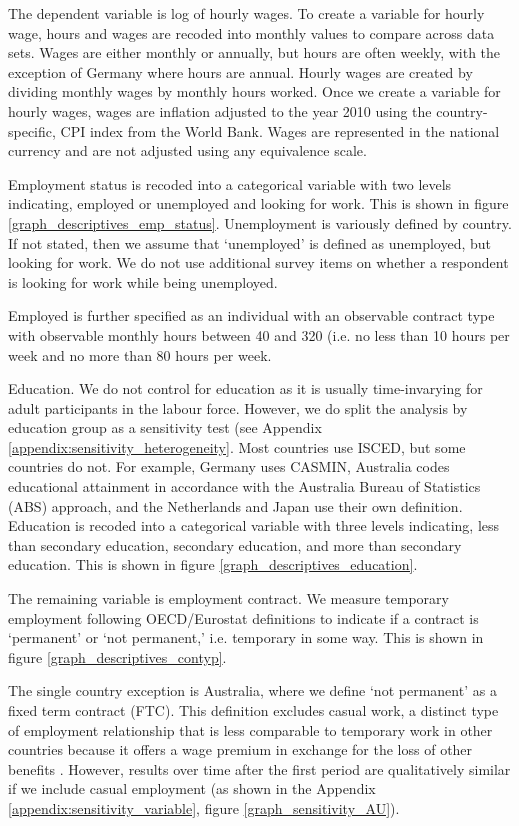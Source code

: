 The dependent variable is log of hourly wages.  To create a variable for hourly wage, hours and wages are recoded into monthly values to compare across data sets.  Wages are either monthly or annually, but hours are often weekly, with the exception of Germany where hours are annual.  Hourly wages are created by dividing monthly wages by monthly hours worked.    Once we create a variable for hourly wages, wages are inflation adjusted to the year 2010 using the country-specific, CPI index from the World Bank.  Wages are represented in the national currency and are not adjusted using any equivalence scale.  

Employment status is recoded into a categorical variable with two levels indicating, employed or unemployed and looking for work.  This is shown in figure \ref{graph_descriptives_emp_status}.  Unemployment is variously defined by country.  If not stated, then we assume that `unemployed' is defined as unemployed, but looking for work.  We do not use additional survey items on whether a respondent is looking for work while being unemployed.  

Employed is further specified as an individual with an observable contract type with observable monthly hours between 40 and 320 (i.e. no less than 10 hours per week and no more than 80 hours per week.


Education.  We do not control for education as it is usually time-invarying for adult participants in the labour force.  However, we do split the analysis by education group as a sensitivity test (see Appendix \ref{appendix:sensitivity_heterogeneity}.  Most countries use ISCED, but some countries do not.  For example, Germany uses CASMIN, Australia codes educational attainment in accordance with the Australia Bureau of Statistics (ABS) approach, and the Netherlands and Japan use their own definition.  Education is recoded into a categorical variable with three levels indicating, less than secondary education, secondary education, and more than secondary education.  This is shown in figure \ref{graph_descriptives_education}.

The remaining variable is employment contract.  We measure temporary employment following OECD/Eurostat definitions to indicate if a contract is `permanent' or  `not permanent,' i.e. temporary in some way.  This is shown in figure \ref{graph_descriptives_contyp}.  

The single country exception is Australia, where we define `not permanent' as a fixed term contract (FTC).  This definition excludes casual work, a distinct type of employment relationship that is less comparable to temporary work in other countries because it offers a wage premium in exchange for the loss of other benefits \citep{mooi-reci_casual_2017}.  However, results over time after the first period are qualitatively similar if we include casual employment (as shown in the Appendix \ref{appendix:sensitivity_variable}, figure \ref{graph_sensitivity_AU}).  

